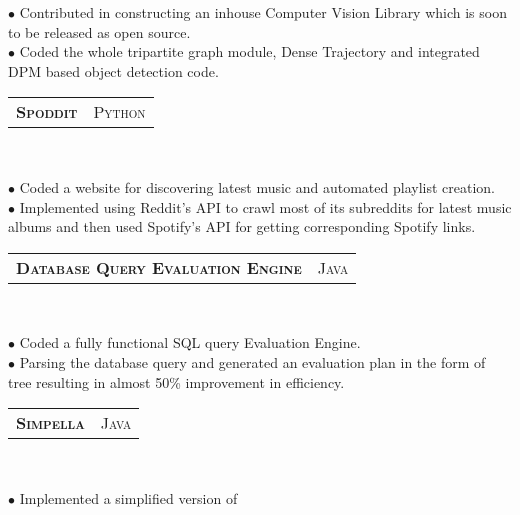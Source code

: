 \documentclass[10pt,letterpaper,oneside]{article}
\begin{document}
\begin{minipage}[t]{0.63\textwidth}
\begin{adjustwidth}{7pt}{0pt}
            {\footnotesize $\bullet$ Contributed in constructing an inhouse Computer Vision Library which is soon to be released as open
                source.\\
            $\bullet$ Coded the whole tripartite graph module, Dense Trajectory and integrated DPM based object detection code.}\\
        \end{adjustwidth}
        \begin{tabular}{c|c}
            \textbf{\normalsize S\textsc{poddit}}
            &\textmd{\normalsize P\textsc{ython}}
        \end{tabular}\\
         \vspace{-4mm}
        \begin{adjustwidth}{7pt}{0pt}
            {\footnotesize $\bullet$ Coded a website for discovering latest music and automated playlist creation.\\ 
            $\bullet$ Implemented using Reddit's API to crawl most of its subreddits for latest music albums and then used Spotify's API for
            getting corresponding Spotify links.}\\
        \end{adjustwidth}
        \begin{tabular}{c|c}
            \textbf{\normalsize D\textsc{atabase} Q\textsc{uery}
            E\textsc{valuation} E\textsc{ngine}}
            &\textmd{\normalsize J\textsc{ava}}
        \end{tabular}\\
         \vspace{-4mm}
        \begin{adjustwidth}{7pt}{0pt}
            {\footnotesize $\bullet$ Coded a fully functional SQL query Evaluation Engine.\\
            $\bullet$ Parsing the database query and generated an evaluation plan in the form of tree resulting in almost 50\% improvement in efficiency.}\\
        \end{adjustwidth}
        \begin{tabular}{c|c}
            \textbf{\normalsize S\textsc{impella}}
            &\textmd{\normalsize J\textsc{ava}}
        \end{tabular}\\
         \vspace{-4mm}
        \begin{adjustwidth}{7pt}{0pt}
            {\footnotesize $\bullet$ Implemented a simplified version of 
}
\end{adjustwidth}
\end{minipage}
\end{document}
